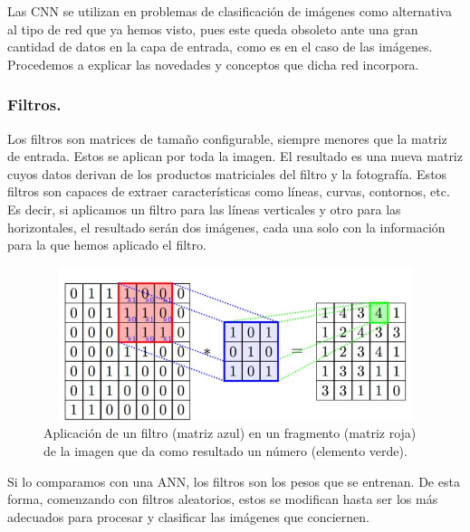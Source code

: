 \documentclass[a4paper,11pt]{article}
\begin{document}
\noindent
Las CNN se utilizan en problemas de clasificación de imágenes como alternativa al tipo de red que ya hemos visto, pues este queda obsoleto ante una gran cantidad de datos en la capa de entrada, como es en el caso de las imágenes.\\ 

\noindent
Procedemos a explicar las novedades y conceptos que dicha red incorpora.

\subsubsection{Filtros.}
Los filtros son matrices de tamaño configurable, siempre menores que la matriz de entrada. Estos se aplican por toda la imagen. El resultado es una nueva matriz cuyos datos derivan de los productos matriciales del filtro y la fotografía. Estos filtros son capaces de extraer características como líneas, curvas, contornos, etc.  \\

\noindent
Es decir, si aplicamos un filtro para las líneas verticales y otro para las horizontales, el resultado serán dos imágenes, cada una solo con la información para la que hemos aplicado el filtro.
\begin{figure}[H]
\centering
\includegraphics[width=12.0cm, height=4.5cm]{Annotation 2020-04-13 191448.png}
\caption{Aplicación de un filtro (matriz azul) en un fragmento (matriz roja) de la imagen que da como resultado un número (elemento verde).}
\end{figure}
\noindent
Si lo comparamos con una ANN, los filtros son los pesos que se entrenan. De esta forma, comenzando con filtros aleatorios, estos se modifican hasta ser los más adecuados para procesar y clasificar las imágenes que conciernen.\\
\end{document}
